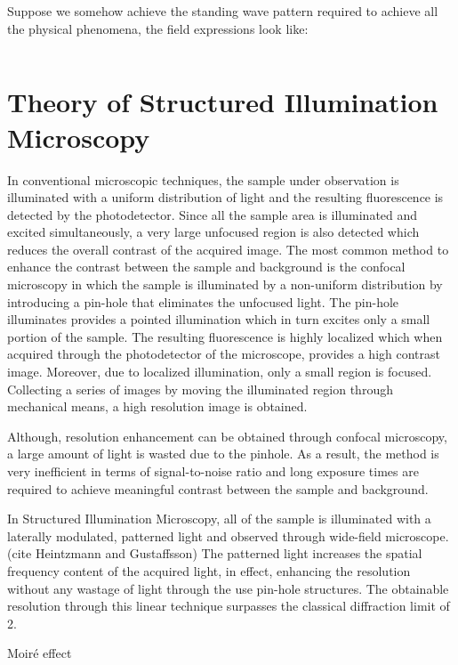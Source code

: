 \documentclass[11pt]{article}
\renewcommand{\^}{\hat}  %
\begin{document}
Suppose we somehow achieve the standing wave pattern required to achieve all the physical phenomena, the field expressions look like:

\begin{equation}

\end{equation}

\section{Theory of Structured Illumination Microscopy}

In conventional microscopic techniques, the sample under observation is illuminated with a uniform distribution of light and the resulting fluorescence is detected by the photodetector. Since all the sample area is illuminated and excited simultaneously, a very large unfocused region is also detected which reduces the overall contrast of the acquired image. The most common method to enhance the contrast between the sample and background is the confocal microscopy in which the sample is illuminated by a non-uniform distribution by introducing a pin-hole that eliminates the unfocused light. The pin-hole illuminates provides a pointed illumination which in turn excites only a small portion of the sample. The resulting fluorescence is highly localized which when acquired through the photodetector of the microscope, provides a high contrast image. Moreover, due to localized illumination, only a small region is focused. Collecting a series of images by moving the illuminated region through mechanical means, a high resolution image is obtained.

Although, resolution enhancement can be obtained through confocal microscopy, a large amount of light is wasted due to the pinhole. As a result, the method is very inefficient in terms of signal-to-noise ratio and long exposure times are required to achieve meaningful contrast between the sample and background.

In Structured Illumination Microscopy, all of the sample is illuminated with a laterally modulated, patterned light and observed through wide-field microscope. (cite Heintzmann and Gustaffsson) The patterned light increases the spatial frequency content of the acquired light, in effect, enhancing the resolution without any wastage of light through the use pin-hole structures. The obtainable resolution through this linear technique surpasses the classical diffraction limit of 2.

Moiré effect
\end{document}
